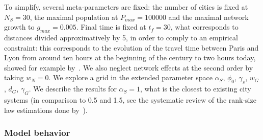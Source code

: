 To simplify, several meta-parameters are fixed: the number of cities is fixed at $N_S = 30$, the maximal population at $P_{max} = 100000$ and the maximal network growth to $g_{max} = 0.005$. Final time is fixed at $t_f = 30$, what corresponds to distances divided approximatively by 5, in order to comply to an empirical constraint: this corresponds to the evolution of the travel time between Paris and Lyon from around ten hours at the beginning of the century to two hours today, showed for example by~\cite{thevenin2013mapping}. We also neglect network effects at the second order by taking $w_N = 0$. We explore a grid in the extended parameter space $\alpha_S$, $\phi_0$, $\gamma_s$, $w_G$, $d_G$, $\gamma_G$. We describe the results for $\alpha_S = 1$, what is the closest to existing city systems (in comparison to 0.5 and 1.5, see the systematic review of the rank-size law estimations done by~\cite{10.1371/journal.pone.0183919}).



\subsubsection{Model behavior}


